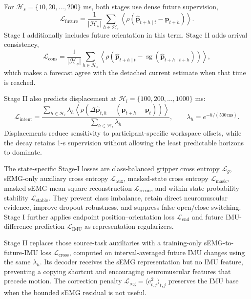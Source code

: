 For $\mathcal H_s=\{10,20,\ldots,200\}$ ms, both stages use dense future
supervision,
\begin{equation}
 \mathcal L_{\mathrm{future}}
 =\frac{1}{|\mathcal H_s|}\sum_{h\in\mathcal H_s}
 \left\langle\rho(\hat{\mathbf p}_{t+h\mid t}-\mathbf p_{t+h})\right\rangle.
\end{equation}
Stage I additionally includes future orientation in this term. Stage II adds
arrival consistency,
\begin{equation}
 \mathcal L_{\mathrm{cons}}
 =\frac{1}{|\mathcal H_s|}\sum_{h\in\mathcal H_s}
 \left\langle\rho\!\left(
 \hat{\mathbf p}_{t+h\mid t}
 -\operatorname{sg}(\hat{\mathbf p}_{t+h\mid t+h})\right)\right\rangle,
\end{equation}
which makes a forecast agree with the detached current estimate when that time
is reached.

Stage II also predicts displacement at
$\mathcal H_l=\{100,200,\ldots,1000\}$ ms:
\begin{equation}
 \mathcal L_{\mathrm{intent}}
 =\frac{\sum_{h\in\mathcal H_l}\lambda_h
 \left\langle\rho\!\left(
 \Delta\hat{\mathbf p}_{t,h}-(\mathbf p_{t+h}-\mathbf p_t)
 \right)\right\rangle}{\sum_{h\in\mathcal H_l}\lambda_h},
 \qquad \lambda_h=e^{-h/(500\,\mathrm{ms})}.
\end{equation}
Displacements reduce sensitivity to participant-specific workspace offsets,
while the decay retains 1-s supervision without allowing the least predictable
horizons to dominate.

The state-specific Stage-I losses are class-balanced gripper cross entropy
$\mathcal L_g$, sEMG-only auxiliary cross entropy $\mathcal L_{\mathrm{aux}}$,
masked-state cross entropy $\mathcal L_{\mathrm{mask}}$, masked-sEMG mean-square
reconstruction $\mathcal L_{\mathrm{recon}}$, and within-state probability
stability $\mathcal L_{\mathrm{stable}}$. They prevent class imbalance, retain
direct neuromuscular evidence, improve dropout robustness, and suppress false
open/close switching. Stage I further applies endpoint position--orientation
loss $\mathcal L_{\mathrm{end}}$ and future IMU-difference prediction
$\mathcal L_{\mathrm{IMU}}$ as representation regularizers.

Stage II replaces those source-task auxiliaries with a training-only
sEMG-to-future-IMU loss $\mathcal L_{\mathrm{cross}}$, computed on
interval-averaged future IMU changes using the same $\lambda_h$. Its decoder
receives the sEMG representation but no IMU feature, preventing a copying
shortcut and encouraging neuromuscular features that precede motion. The
correction penalty
$\mathcal L_{\mathrm{reg}}=\langle c_{t,j}^2\rangle_{t,j}$ preserves the IMU
base when the bounded sEMG residual is not useful.

